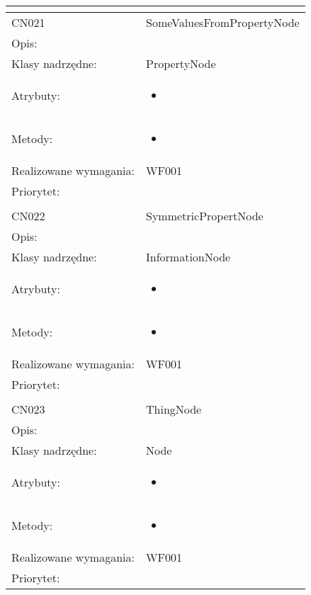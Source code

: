 \documentclass[a4paper,10pt]{article}
\begin{document}
\begin{center}
\begin{tabular}{|m{3cm}|m{9cm}|}
\multicolumn{2}{c}{} \\
 \hline

CN021 & SomeValuesFromPropertyNode \\ \hline
Opis: &     \\ \hline
Klasy nadrzędne: & PropertyNode     \\ \hline
Atrybuty: & \begin{itemize}
 \item 
\end{itemize}
 \\ \hline
Metody: & \begin{itemize}
 \item 
\end{itemize}
  \\ \hline
Realizowane wymagania: & WF001 \\ \hline
Priorytet: &  \\ \hline

\multicolumn{2}{c}{} \\
 \hline

CN022 & SymmetricPropertNode \\ \hline
Opis: &     \\ \hline
Klasy nadrzędne: & InformationNode     \\ \hline
Atrybuty: & \begin{itemize}
 \item 
\end{itemize}
 \\ \hline
Metody: & \begin{itemize}
 \item 
\end{itemize}
  \\ \hline
Realizowane wymagania: & WF001 \\ \hline
Priorytet: &  \\ \hline

\multicolumn{2}{c}{} \\
 \hline

CN023 & ThingNode \\ \hline
Opis: &     \\ \hline
Klasy nadrzędne: & Node     \\ \hline
Atrybuty: & \begin{itemize}
 \item 
\end{itemize}
 \\ \hline
Metody: & \begin{itemize}
 \item 
\end{itemize}
  \\ \hline
Realizowane wymagania: & WF001 \\ \hline
Priorytet: &  \\ \hline


\end{tabular}
\end{center}
\end{document}
